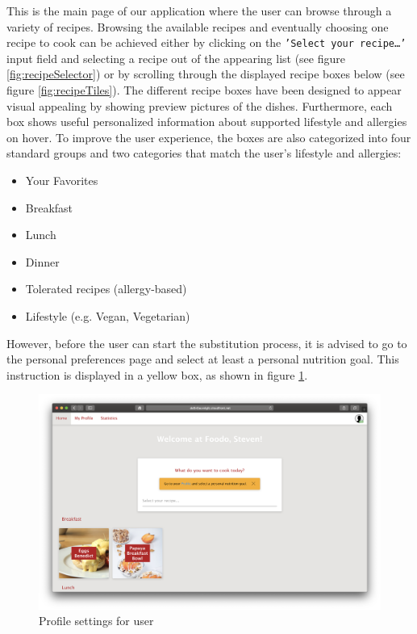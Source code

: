 This is the main page of our application where the user can browse through a variety of recipes. Browsing the available recipes and eventually choosing one recipe to cook can be achieved either by clicking on the \texttt{'Select your recipe…'} input field and selecting a recipe out of the appearing list (see figure \ref{fig:recipeSelector}) or by scrolling through the displayed recipe boxes below (see figure \ref{fig:recipeTiles}). The different recipe boxes have been designed to appear visual appealing by showing preview pictures of the dishes. Furthermore, each box shows useful personalized information about supported lifestyle and allergies on hover. To improve the user experience, the boxes are also categorized into four standard groups and two categories that match the user's lifestyle and allergies:
\clearpage
\begin{itemize}
\item Your Favorites
\item Breakfast
\item Lunch
\item Dinner
\item Tolerated recipes (allergy-based)
\item Lifestyle (e.g. Vegan, Vegetarian)
\end{itemize}	
However, before the user can start the substitution process, it is advised to go to the personal preferences page and select at least a personal nutrition goal. This instruction is displayed in a yellow box, as shown in figure \ref{fig:profilesetting}.

\vspace{-1em}
\begin{figure}[H]
	\captionsetup{justification=centering}
	\centering
	\includegraphics[scale=0.30]{Ressourcen/img/screenshots/screenshot41.png}
	\vspace{-3em}
	\caption{Profile settings for user}
	\label{fig:profilesetting}
\end{figure}

